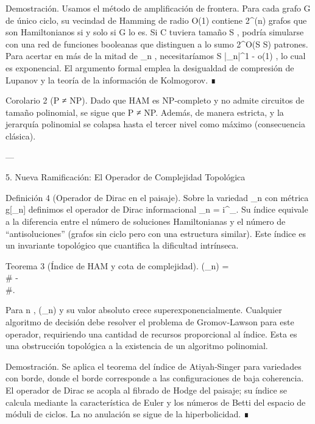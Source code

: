 \documentclass[12pt,twoside]{book}
\begin{document}
Demostración. Usamos el método de amplificación de frontera. Para cada grafo  G  de único ciclo, su vecindad de Hamming de radio  O(1)  contiene  2^{\Omega(n)}  grafos que son Hamiltonianos si y solo si  G  lo es. Si  C  tuviera tamaño  S , podría simularse con una red de funciones booleanas que distinguen a lo sumo  2^{O(S \log S)}  patrones. Para acertar en más de la mitad de  _n , necesitaríamos  S \ge |_n|^{1 - o(1)} , lo cual es exponencial. El argumento formal emplea la desigualdad de compresión de Lupanov y la teoría de la información de Kolmogorov. ∎

Corolario 2 (P ≠ NP).
Dado que HAM es NP‑completo y no admite circuitos de tamaño polinomial, se sigue que P ≠ NP. Además,   \subsetneq {}  de manera estricta, y la jerarquía polinomial se colapsa hasta el tercer nivel como máximo (consecuencia clásica).

---

5. Nueva Ramificación: El Operador de Complejidad Topológica

Definición 4 (Operador de Dirac en el paisaje).
Sobre la variedad  _n  con métrica  g[\rho_n]  definimos el operador de Dirac informacional  _n = i\gamma^\mu \nabla_\mu . Su índice equivale a la diferencia entre el número de soluciones Hamiltonianas y el número de “antisoluciones” (grafos sin ciclo pero con una estructura similar). Este índice es un invariante topológico que cuantifica la dificultad intrínseca.

Teorema 3 (Índice de HAM y cota de complejidad).
(_n) = \\# - \\#. 


Para  n  ,  (_n)   y su valor absoluto crece superexponencialmente. Cualquier algoritmo de decisión debe resolver el problema de Gromov‑Lawson para este operador, requiriendo una cantidad de recursos proporcional al índice. Esta es una obstrucción topológica a la existencia de un algoritmo polinomial.

Demostración. Se aplica el teorema del índice de Atiyah‑Singer para variedades con borde, donde el borde corresponde a las configuraciones de baja coherencia. El operador de Dirac se acopla al fibrado de Hodge del paisaje; su índice se calcula mediante la característica de Euler y los números de Betti del espacio de móduli de ciclos. La no anulación se sigue de la hiperbolicidad. ∎
\end{document}
